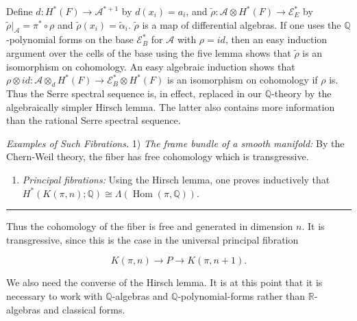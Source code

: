 \documentclass[
  english,
  a3paper,
  a3paper]{extarticle}
\providecommand{\tightlist}{%
  \setlength{\itemsep}{0pt}\setlength{\parskip}{0pt}}
\begin{document}
Define \(d:H^*(F)\to\mathcal A^{*+1}\) by \(d(x_i)=a_i\), and
\(\widetilde\rho:\mathcal A\otimes H^*(F)\to\mathcal E_E^*\) by
\(\widetilde\rho|_{\mathcal A}=\pi^*\circ\rho\) and
\(\widetilde\rho(x_i)=\widetilde\alpha_i\). \(\widetilde\rho\) is a map
of differential algebras. If one uses the \(\mathbb Q\)-polynomial forms
on the base \(\mathcal E_B^*\) for \(\mathcal A\) with \(\rho=id\), then
an easy induction argument over the cells of the base using the five
lemma shows that \(\widetilde\rho\) is an isomorphism on cohomology. An
easy algebraic induction shows that
\(\rho\otimes id:\mathcal A\otimes_d H^*(F)\to\mathcal E_B^*\otimes H^*(F)\)
is an isomorphism on cohomology if \(\rho\) is. Thus the Serre spectral
sequence is, in effect, replaced in our \(\mathbb Q\)-theory by the
algebraically simpler Hirsch lemma. The latter also contains more
information than the rational Serre spectral sequence.

\emph{Examples of Such Fibrations.} 1) \emph{The frame bundle of a
smooth manifold:} By the Chern-Weil theory, the fiber has free
cohomology which is transgressive.

\begin{enumerate}
\def\labelenumi{\arabic{enumi})}
\setcounter{enumi}{1}
\tightlist
\item
  \emph{Principal fibrations:} Using the Hirsch lemma, one proves
  inductively that
  \(H^*(K(\pi,n);\mathbb Q)\cong\Lambda(\operatorname{Hom}(\pi,\mathbb Q))\).
\end{enumerate}

\clearpage



\par

\vspace{0.7mm}\hrule\vspace{1.6mm}

\fontsize{9}{11}\selectfont

Thus the cohomology of the fiber is free and generated in dimension
\(n\). It is transgressive, since this is the case in the universal
principal fibration

\[K(\pi,n)\to P\to K(\pi,n+1).\]

We also need the converse of the Hirsch lemma. It is at this point that
it is necessary to work with \(\mathbb Q\)-algebras and
\(\mathbb Q\)-polynomial-forms rather than \(\mathbb R\)-algebras and
classical forms.
\end{document}
